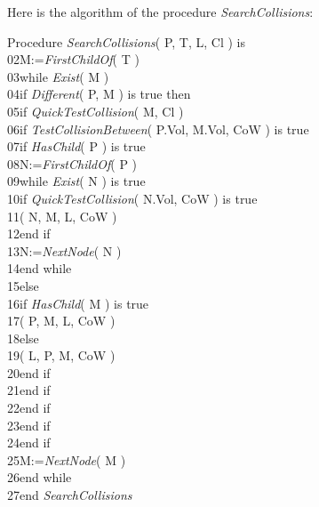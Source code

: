 \documentclass[12pt, a4paper]{article}
\begin{document}
Here is the algorithm of the procedure {\em SearchCollisions}:\\

\begin{ttfamily}
\quad Procedure {\em SearchCollisions}( P, T, L, Cl ) is\\
02\quad\quad M:={\em FirstChildOf}( T )\\
03\quad\quad while {\em Exist}( M )\\
04\quad\quad\quad if {\em Different}( P, M ) is true then\\
05\quad\quad\quad\quad if {\em QuickTestCollision}( M, Cl )\\
06\quad\quad\quad\quad\quad if {\em TestCollisionBetween}( P.Vol, M.Vol, CoW ) is true\\
07\quad\quad\quad\quad\quad\quad if {\em HasChild}( P ) is true\\
08\quad\quad\quad\quad\quad\quad\quad N:={\em FirstChildOf}( P )\\
09\quad\quad\quad\quad\quad\quad\quad while {\em Exist}( N ) is true\\
10\quad\quad\quad\quad\quad\quad\quad\quad if {\em QuickTestCollision}( N.Vol, CoW ) is true\\
11\quad\quad\quad\quad\quad\quad\quad\quad{}( N, M, L, CoW )\\
12\quad\quad\quad\quad\quad\quad\quad\quad end if\\
13\quad\quad\quad\quad\quad\quad\quad\quad N:={\em NextNode}( N )\\
14\quad\quad\quad\quad\quad\quad\quad end while\\
15\quad\quad\quad\quad\quad\quad else\\
16\quad\quad\quad\quad\quad\quad\quad if {\em HasChild}( M ) is true\\
17\quad\quad\quad\quad\quad\quad\quad{}( P, M, L, CoW )\\
18\quad\quad\quad\quad\quad\quad\quad else\\
19\quad\quad\quad\quad\quad\quad\quad{}( L, P, M, CoW )\\
20\quad\quad\quad\quad\quad\quad\quad end if\\
21\quad\quad\quad\quad\quad\quad end if\\
22\quad\quad\quad\quad\quad end if\\
23\quad\quad\quad\quad end if\\
24\quad\quad\quad end if\\
25\quad\quad\quad M:={\em NextNode}( M )\\
26\quad\quad end while\\
27\quad end {\em SearchCollisions}\\
\end{ttfamily}
\end{document}
